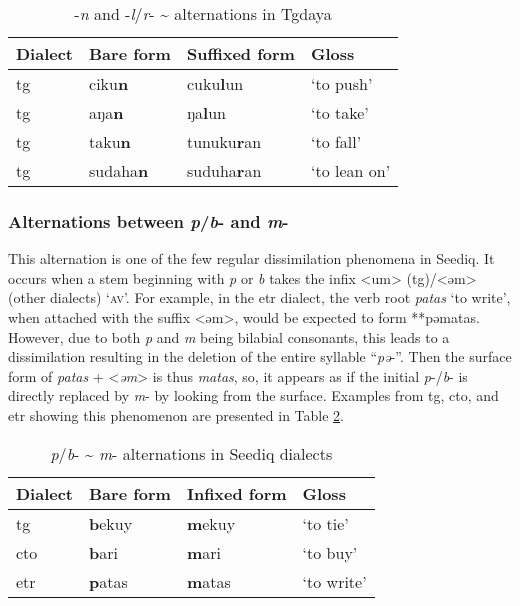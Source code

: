 \begin{table}[!htbp]
\centering
\caption{-\textit{n} and -\textit{l}/\textit{r}- \~{} alternations in Tgdaya}
\label{tab:lrn_alt}
\begin{tabular}{llll}
\hline
Dialect  & Bare form & Suffixed form & Gloss        \\ \hline
\acl{tg} & ciku\textbf{n}     & cuku\textbf{l}un      & `to push'    \\
\acl{tg} & aŋa\textbf{n}      & ŋa\textbf{l}un        & `to take'    \\
\acl{tg} & taku\textbf{n}     & tunuku\textbf{r}an    & `to fall'    \\
\acl{tg} & sudaha\textbf{n}   & suduha\textbf{r}an    & `to lean on' \\\hline
\end{tabular}
\end{table}

\subsubsection{Alternations between \textit{p}/\textit{b}- and \textit{m}-} \label{sec:pbm_alter}

This alternation is one of the few regular dissimilation phenomena in Seediq. It occurs when a stem beginning with \textit{p} or \textit{b} takes the infix <um> (\acs{tg})/<əm> (other dialects) `\textsc{av}'. For example, in the \acl{etr} dialect, the verb root \textit{patas} `to write', when attached with the suffix <əm>, would be expected to form **pəmatas. However, due to both \textit{p} and \textit{m} being bilabial consonants, this leads to a dissimilation resulting in the deletion of the entire syllable ``\textit{pə}-''. Then the surface form of \textit{patas} + <\textit{əm}> is thus \textit{matas}, so, it appears as if the initial \textit{p}-/\textit{b}- is directly replaced by \textit{m}- by looking from the surface. Examples from \acl{tg}, \acl{cto}, and \acl{etr} showing this phenomenon are presented in Table \ref{tab:bpm_alt}.

\begin{table}[!htbp]
\centering
\caption{\textit{p}/\textit{b}- \~{} \textit{m}- alternations in Seediq dialects}
\label{tab:bpm_alt}
\begin{tabular}{llll}
\hline
Dialect   & Bare form & Infixed form & Gloss      \\ \hline
\acl{tg}  & \textbf{b}ekuy     & \textbf{m}ekuy        & `to tie'   \\ 
\acl{cto} & \textbf{b}ari      & \textbf{m}ari         & `to buy'   \\
\acl{etr} & \textbf{p}atas     & \textbf{m}atas        & `to write' \\ \hline
\end{tabular}
\end{table}


